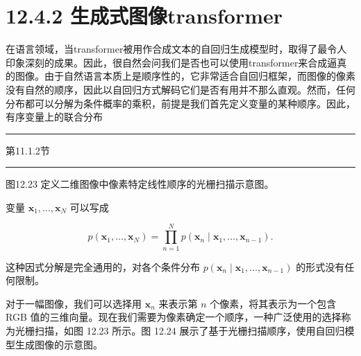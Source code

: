 \documentclass[10pt]{article}
\newcommand{\HRule}{\begin{center}\rule{0.9\linewidth}{0.2mm}\end{center}}
\begin{document}
\section*{12.4.2 生成式图像transformer}

在语言领域，当transformer被用作合成文本的自回归生成模型时，取得了最令人印象深刻的成果。因此，很自然会问我们是否也可以使用transformer来合成逼真的图像。由于自然语言本质上是顺序性的，它非常适合自回归框架，而图像的像素没有自然的顺序，因此以自回归方式解码它们是否有用并不那么直观。然而，任何分布都可以分解为条件概率的乘积，前提是我们首先定义变量的某种顺序。因此，有序变量上的联合分布

\HRule

第11.1.2节

\HRule

图12.23 定义二维图像中像素特定线性顺序的光栅扫描示意图。

\begin{center}
\end{center}

变量 \({\mathbf{x}}_{1},\ldots ,{\mathbf{x}}_{N}\) 可以写成

\[
p\left( {{\mathbf{x}}_{1},\ldots ,{\mathbf{x}}_{N}}\right)  = \mathop{\prod }\limits_{{n = 1}}^{N}p\left( {{\mathbf{x}}_{n} \mid  {\mathbf{x}}_{1},\ldots ,{\mathbf{x}}_{n - 1}}\right) . \tag{12.37}
\]

这种因式分解是完全通用的，对各个条件分布 \(p\left( {{\mathbf{x}}_{n} \mid  {\mathbf{x}}_{1},\ldots ,{\mathbf{x}}_{n - 1}}\right)\) 的形式没有任何限制。

对于一幅图像，我们可以选择用 \({\mathbf{x}}_{n}\) 来表示第 \(n\) 个像素，将其表示为一个包含 RGB 值的三维向量。现在我们需要为像素确定一个顺序，一种广泛使用的选择称为光栅扫描，如图 12.23 所示。图 12.24 展示了基于光栅扫描顺序，使用自回归模型生成图像的示意图。
\end{document}
